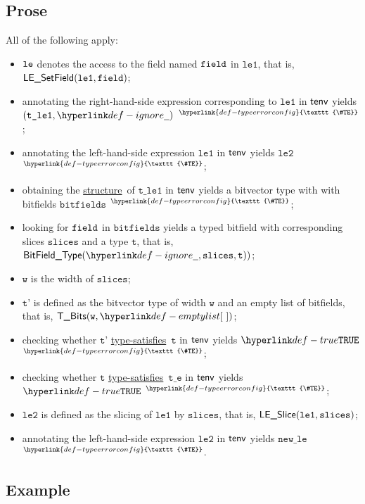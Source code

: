 \documentclass{book}
\newcommand\TypeErrorConfig[0]{\hyperlink{def-typeerrorconfig}{\texttt{\#TE}}}
\newcommand\ProseOrTypeError[0]{\hyperlink{def-proseortypeerror}{$^{\TypeErrorConfig}$}}
\newcommand\structure[0]{\hyperlink{def-structure}{structure}}
\newcommand\typesatisfies[0]{\hyperlink{def-typesatisfies}{type-satisfies}}
\newcommand\vt[0]{\texttt{t}}
\newcommand\vte[0]{\texttt{t\_e}}
\newcommand\vleone[0]{\texttt{le1}}
\newcommand\vletwo[0]{\texttt{le2}}
\newcommand\vtleone[0]{\texttt{t\_le1}}
\newcommand\vw[0]{\texttt{w}}
\newcommand\bitfields[0]{\texttt{bitfields}}
\newcommand\vslices[0]{\texttt{slices}}
\newcommand\newle[0]{\texttt{new\_le}}
\newcommand\slices[0]{\texttt{slices}}
\newcommand\vtp[0]{\texttt{t'}}
\begin{document}
\subsection{Prose}
All of the following apply:
\begin{itemize}
  \item $\texttt{le}$ denotes the access to the field named $\texttt{field}$ in $\vleone$, that is, \\ $\LESetField(\vleone, \field)$;
  \item annotating the right-hand-side expression corresponding to $\vleone$ in $\textsf{tenv}$ yields \\ $(\vtleone, \Ignore)$ \ProseOrTypeError;
  \item annotating the left-hand-side expression $\vleone$ in $\textsf{tenv}$ yields $\vletwo$ \ProseOrTypeError;
  \item obtaining the \structure\ of $\vtleone$ in $\textsf{tenv}$ yields a bitvector type with with bitfields $\bitfields$ \ProseOrTypeError;
  \item looking for $\texttt{field}$ in $\bitfields$ yields a typed bitfield with corresponding slices $\slices$ and a type $\vt$,
        that is, \\ $\BitFieldType(\Ignore, \vslices, \vt))$;
  \item $\vw$ is the width of $\slices$;
  \item $\vtp$ is defined as the bitvector type of width $\vw$ and an empty list of bitfields, that is, $\TBits(\vw , \emptylist)$;
  \item checking whether $\vtp$ \typesatisfies\ $\vt$ in $\textsf{tenv}$ yields $\True$ \ProseOrTypeError;
  \item checking whether $\vt$ \typesatisfies\ $\vte$ in $\textsf{tenv}$ yields $\True$ \ProseOrTypeError;
  \item $\vletwo$ is defined as the slicing of $\vleone$ by $\slices$, that is, $\LESlice(\vleone, \slices)$;
  \item annotating the left-hand-side expression $\vletwo$ in $\textsf{tenv}$ yields $\newle$ \ProseOrTypeError.
\end{itemize}

\subsection{Example}

\end{document}
